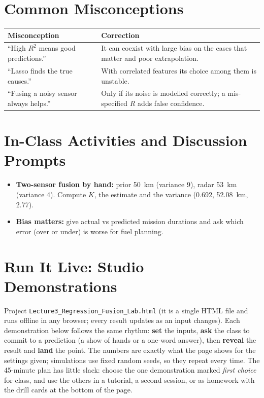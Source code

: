 \documentclass[11pt]{article}
\begin{document}
\section{Common Misconceptions}\begin{center}\small\renewcommand{\arraystretch}{1.35}\begin{tabularx}{\textwidth}{@{}>{\raggedright\arraybackslash}X >{\raggedright\arraybackslash}X@{}}\toprule\textbf{Misconception} & \textbf{Correction}\\\midrule``High $R^2$ means good predictions.'' & It can coexist with large bias on the cases that matter and poor extrapolation.\\
``Lasso finds the true causes.'' & With correlated features its choice among them is unstable.\\
``Fusing a noisy sensor always helps.'' & Only if its noise is modelled correctly; a mis-specified $R$ adds false confidence.\\\bottomrule\end{tabularx}\end{center}

\section{In-Class Activities and Discussion Prompts}\label{sec:act}\begin{itemize}\item \textbf{Two-sensor fusion by hand:} prior 50~km (variance 9), radar 53~km (variance 4). Compute $K$, the estimate and the variance (0.692, 52.08~km, 2.77).\item \textbf{Bias matters:} give actual vs predicted mission durations and ask which error (over or under) is worse for fuel planning.\end{itemize}

\section{Run It Live: Studio Demonstrations}\label{sec:live}

Project \texttt{Lecture3\_Regression\_Fusion\_Lab.html} (it is a single HTML file and runs offline in any browser; every result updates as an input changes). Each demonstration below follows the same rhythm: \textbf{set} the inputs, \textbf{ask} the class to commit to a prediction (a show of hands or a one-word answer), then \textbf{reveal} the result and \textbf{land} the point. The numbers are exactly what the page shows for the settings given; simulations use fixed random seeds, so they repeat every time. The 45-minute plan has little slack: choose the one demonstration marked \emph{first choice} for class, and use the others in a tutorial, a second session, or as homework with the drill cards at the bottom of the page.
\end{document}
